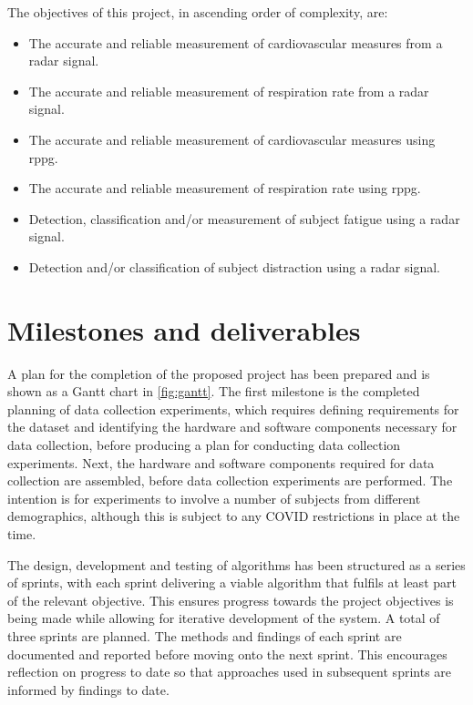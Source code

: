 \documentclass[11pt, parskip=half*,twoside=false]{scrbook}
\begin{document}
{The objectives of this project, in ascending order of complexity, are:
\begin{itemize}
	\item The accurate and reliable measurement of cardiovascular measures from a radar signal.
	\item The accurate and reliable measurement of respiration rate from a radar signal.
	\item The accurate and reliable measurement of cardiovascular measures using \gls{rppg}.
	\item The accurate and reliable measurement of respiration rate using \gls{rppg}.
	\item Detection, classification and/or measurement of subject fatigue using a radar signal.
	\item Detection and/or classification of subject distraction using a radar signal.
\end{itemize}

\section{Milestones and deliverables}

A plan for the completion of the proposed project has been prepared and is shown as a Gantt chart in \cref{fig:gantt}. The first milestone is the completed planning of data collection experiments, which requires defining requirements for the dataset and identifying the hardware and software components necessary for data collection, before producing a plan for conducting data collection experiments. Next, the hardware and software components required for data collection are assembled, before data collection experiments are performed. The intention is for experiments to involve a number of subjects from different demographics, although this is subject to any COVID restrictions in place at the time.  

The design, development and testing of algorithms has been structured as a series of sprints, with each sprint delivering a viable algorithm that fulfils at least part of the relevant objective. This ensures progress towards the project objectives is being made while allowing for iterative development of the system. A total of three sprints are planned. The methods and findings of each sprint are documented and reported before moving onto the next sprint. This encourages reflection on progress to date so that approaches used in subsequent sprints are informed by findings to date.  

}
\end{document}
